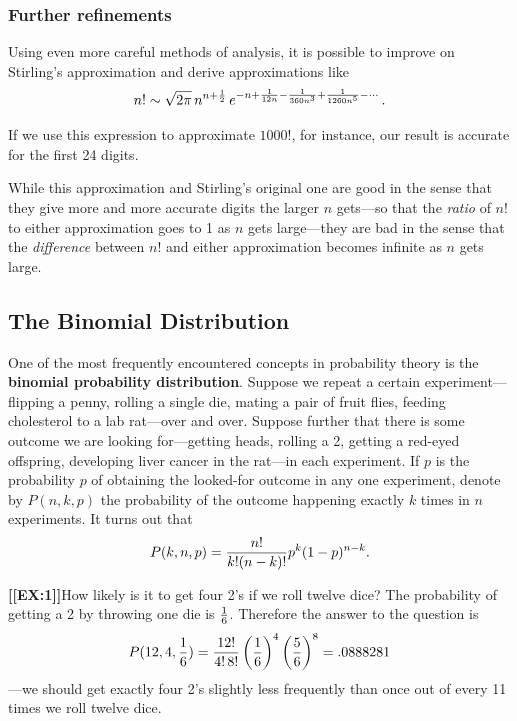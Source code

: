 {{{{\subsubsection{Further refinements}

Using even more careful methods of analysis, 
it is possible to improve on Stirling's approximation and derive approximations like
\[
n!\sim \sqrt{2\pi}\,n^{n+{1 \over 2}}\,e^{-n+{1 \over 12n}-{1 \over 360n^3}+{1 \over 1260n^5}-\cdots} \,.
\]

If we use this expression to approximate $1000!$, for instance, our result is accurate for the first 24 digits.  

While this approximation and Stirling's original one are good in the sense that they give more and more accurate digits the larger $n$ gets---so that the {\em ratio} of $n!$ to either approximation goes to 1 as $n$ gets large---they are bad in the sense that the {\em difference} between $n!$ and either approximation becomes infinite as $n$ gets large.

\subsection{The Binomial Distribution}

One of the most frequently encountered concepts in probability theory is the {\bf binomial probability distribution}. Suppose we repeat a certain experiment---flipping a penny, rolling a single die, mating a pair of fruit flies, feeding cholesterol to a lab rat---over and over.  Suppose further that there is some outcome we are looking for---getting heads, rolling a 2, getting a red-eyed offspring, developing liver cancer in the rat---in each experiment.  If $p$ is the probability $p$ of obtaining the looked-for outcome in any one experiment, denote by $P(n, k, p)$ the probability of the outcome happening exactly $k$ times in $n$ experiments.  It turns out that
\[
P(k,n, p)={n!\over k!(n-k)!}p^k(1-p)^{n-k}.
\]

\medskip



{\bf [[EX:1]]}\quad How likely is it to get four 2's if we roll twelve dice?  The probability of getting a 2 by throwing one die is ${1\over 6}$.  Therefore the answer to the question is
\[
P(12, 4, {1 \over 6})={12! \over 4!\, 8!}\left({1 \over 6}\right)^4\left({5 \over 6}\right)^8=.0888281
\]
---we should get exactly four 2's slightly less frequently than once out of every 11 times we roll twelve dice.

}}}}
